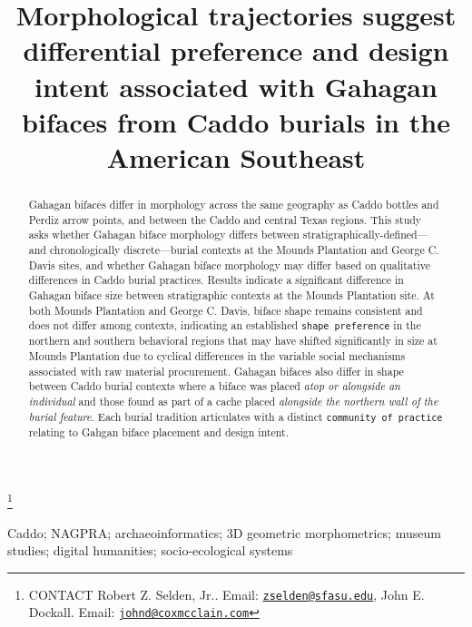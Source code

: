 \documentclass[]{interact}
\theoremstyle{plain}%
\theoremstyle{definition}
\theoremstyle{remark}
\begin{document}

\title{Morphological trajectories suggest differential preference and
design intent associated with Gahagan bifaces from Caddo burials in the
American Southeast}


\author{
}

\thanks{CONTACT Robert Z. Selden,
Jr.. Email: \href{mailto:zselden@sfasu.edu}{\nolinkurl{zselden@sfasu.edu}}, John
E.
Dockall. Email: \href{mailto:johnd@coxmcclain.com}{\nolinkurl{johnd@coxmcclain.com}}}

\maketitle

\begin{abstract}
Gahagan bifaces differ in morphology across the same geography as Caddo
bottles and Perdiz arrow points, and between the Caddo and central Texas
regions. This study asks whether Gahagan biface morphology differs
between stratigraphically-defined---and chronologically
discrete---burial contexts at the Mounds Plantation and George C. Davis
sites, and whether Gahagan biface morphology may differ based on
qualitative differences in Caddo burial practices. Results indicate a
significant difference in Gahagan biface size between stratigraphic
contexts at the Mounds Plantation site. At both Mounds Plantation and
George C. Davis, biface shape remains consistent and does not differ
among contexts, indicating an established \texttt{shape\ preference} in
the northern and southern behavioral regions that may have shifted
significantly in size at Mounds Plantation due to cyclical differences
in the variable social mechanisms associated with raw material
procurement. Gahagan bifaces also differ in shape between Caddo burial
contexts where a biface was placed \emph{atop or alongside an
individual} and those found as part of a cache placed \emph{alongside
the northern wall of the burial feature}. Each burial tradition
articulates with a distinct \texttt{community\ of\ practice} relating to
Gahgan biface placement and design intent.
\end{abstract}

\begin{keywords}
Caddo; NAGPRA; archaeoinformatics; 3D geometric morphometrics; museum
studies; digital humanities; socio-ecological systems
\end{keywords}
\end{document}
